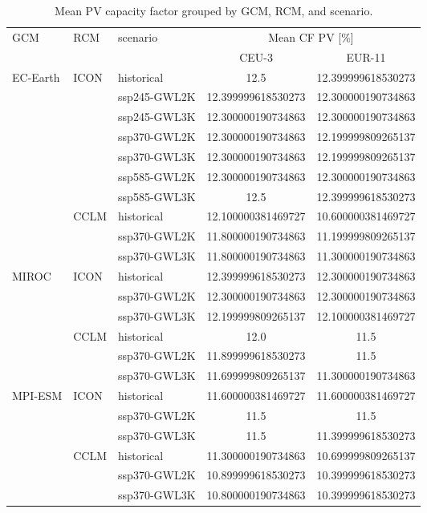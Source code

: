 \begin{table}[!htbp]
\centering
\caption{Mean PV capacity factor grouped by GCM, RCM, and scenario.}
\label{Table:CF_PV_changes}
\begin{tabular}{lll|cc}
\toprule
GCM & RCM & scenario & \multicolumn{2}{c}{Mean CF PV [\%]} \\
 & & & CEU-3 & EUR-11 \\
\midrule
\cmidrule(lr){1-5}
\multirow{10}{*}{EC-Earth} & \multirow{7}{*}{ICON} & historical & 12.5 & 12.399999618530273 \\
 &  & ssp245-GWL2K & 12.399999618530273 & 12.300000190734863 \\
 &  & ssp245-GWL3K & 12.300000190734863 & 12.300000190734863 \\
 &  & ssp370-GWL2K & 12.300000190734863 & 12.199999809265137 \\
 &  & ssp370-GWL3K & 12.300000190734863 & 12.199999809265137 \\
 &  & ssp585-GWL2K & 12.300000190734863 & 12.300000190734863 \\
 &  & ssp585-GWL3K & 12.5 & 12.399999618530273 \\
\cmidrule(lr){2-5}
 & \multirow{3}{*}{CCLM} & historical & 12.100000381469727 & 10.600000381469727 \\
 &  & ssp370-GWL2K & 11.800000190734863 & 11.199999809265137 \\
 &  & ssp370-GWL3K & 11.800000190734863 & 11.300000190734863 \\
\cmidrule(lr){2-5}
\multirow{6}{*}{MIROC} & \multirow{3}{*}{ICON} & historical & 12.399999618530273 & 12.300000190734863 \\
 &  & ssp370-GWL2K & 12.300000190734863 & 12.300000190734863 \\
 &  & ssp370-GWL3K & 12.199999809265137 & 12.100000381469727 \\
\cmidrule(lr){2-5}
 & \multirow{3}{*}{CCLM} & historical & 12.0 & 11.5 \\
 &  & ssp370-GWL2K & 11.899999618530273 & 11.5 \\
 &  & ssp370-GWL3K & 11.699999809265137 & 11.300000190734863 \\
\cmidrule(lr){2-5}
\multirow{6}{*}{MPI-ESM} & \multirow{3}{*}{ICON} & historical & 11.600000381469727 & 11.600000381469727 \\
 &  & ssp370-GWL2K & 11.5 & 11.5 \\
 &  & ssp370-GWL3K & 11.5 & 11.399999618530273 \\
\cmidrule(lr){2-5}
 & \multirow{3}{*}{CCLM} & historical & 11.300000190734863 & 10.699999809265137 \\
 &  & ssp370-GWL2K & 10.899999618530273 & 10.399999618530273 \\
 &  & ssp370-GWL3K & 10.800000190734863 & 10.399999618530273 \\
\bottomrule
\end{tabular}
\end{table}
